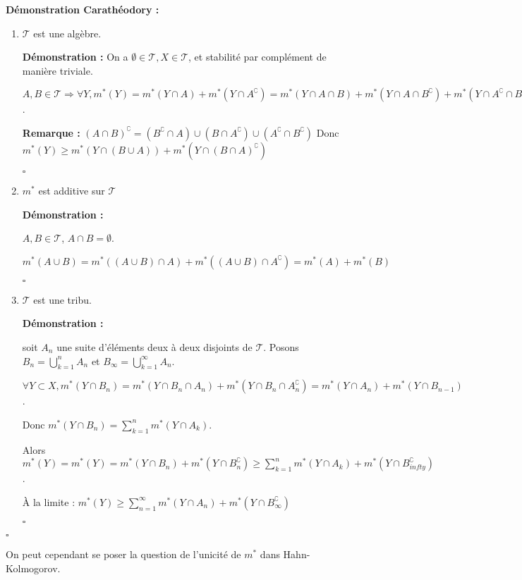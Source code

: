 \documentclass[10pt,a4paper,notitlepage ]{report}
\newcommand{\comp}[1]{#1^\complement}
\newcounter{th}
\newenvironment{demo}[1][]{

	\textbf{Démonstration #1 :}
}{\begin{flushright}
	$\square$
\end{flushright}
}
\newenvironment{rem}{
	
	\textbf{Remarque :}}{}
\begin{document}
\begin{demo}[Carathéodory]
	
	\begin{enumerate}
		\item $\mathcal T$ est une algèbre. 
		\begin{demo} On a $\emptyset \in \mathcal T, X \in \mathcal T$, et stabilité par complément de manière triviale.
		
		$A,B \in \mathcal T \Rightarrow \forall Y, m^*(Y) = m^*(Y\cap A) + m^*(Y \cap \comp A) = m^*(Y \cap A \cap B) + m^*(Y \cap A \cap \comp B) + m^*(Y \cap \comp A \cap \comp B) + m^*(Y \cap \comp A \cap B)$.
		
		\begin{rem}
			$\comp{(A \cap B)} = (\comp B \cap A) \cup (B \cap \comp A) \cup (\comp A \cap \comp B)$
		\end{rem}
		Donc $m^*(Y) \ge m^*(Y \cap (B \cup A)) + m^*(Y \cap \comp{(B \cap A)})$
		\end{demo}
		\item $m^*$ est additive sur $\mathcal T$
		\begin{demo}
			$A,B \in \mathcal T$, $A\cap B = \emptyset$.
			
			$m^*(A\cup B) = m^*((A\cup B)\cap A) + m^*((A \cup B) \cap \comp A) = m^*(A) + m^*(B)$
		\end{demo}
		\item $\mathcal T$ est une tribu.
		\begin{demo}
			soit $A_n$ une suite d'éléments deux à deux disjoints de $\mathcal T$. Posons $B_n =\bigcup_{k=1}^n A_n$ et $B_\infty = \bigcup_{k=1}^\infty A_n$.
			
			$\forall Y \subset X, m^*(Y \cap B_n) = m^*(Y \cap B_n \cap A_n) + m^*(Y \cap B_n \cap \comp{A_n}) = m^*(Y \cap A_n) + m^*(Y \cap B_{n-1})$.
			
			Donc $m^*(Y\cap B_n) = \sum_{k=1}^n m^*(Y \cap A_k)$.
			
			Alors $m^*(Y) = m^*(Y) = m^*(Y \cap B_n) + m^*(Y \cap \comp{B_n}) \ge \sum_{k=1}^n m^*(Y \cap A_k) + m^*(Y \cap \comp{B_{infty}})$.
			
			À la limite : $m^*(Y) \ge \sum_{n=1}^\infty m^*(Y \cap A_n) + m^*(Y \cap \comp{B_{\infty}})$
		\end{demo}
	\end{enumerate}
\end{demo}

On peut cependant se poser la question de l'unicité de $m^*$ dans Hahn-Kolmogorov.
\end{document}
